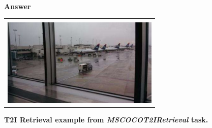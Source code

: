 \begin{figure}[h]
\begin{tabular}{|>{\centering\arraybackslash} p{0.7\linewidth}|}
\hline
\end{tabular}
\\
\textbf{Answer} 
\\
\begin{tabular}{|>{\centering\arraybackslash} p{0.7\linewidth}|}
\hline
\\
\includegraphics[width=0.9\linewidth,frame]{figures/examples_assests/retrieval/answer.pdf} \\
\hline
\end{tabular}
\caption{\textbf{T2I Retrieval example from \emph{MSCOCOT2IRetrieval} task.}}
\label{fig:retrieval_example}
\end{figure}